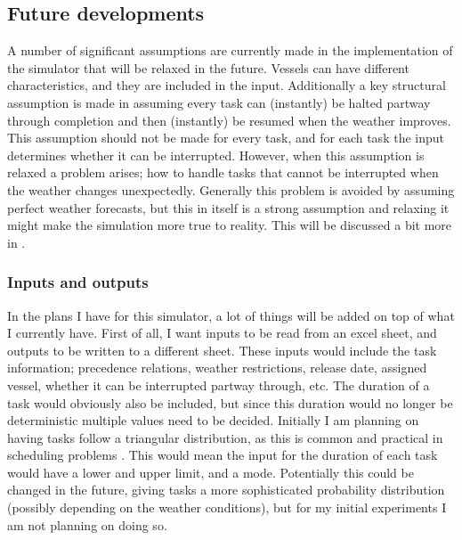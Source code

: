 \documentclass[a4paper,12pt]{article}
\begin{document}
\subsection{Future developments} \label{ss:simfut}
A number of significant assumptions are currently made in the implementation of the simulator that will be relaxed in the future. Vessels can have different characteristics, and they are included in the input. Additionally a key structural assumption is made in assuming every task can (instantly) be halted partway through completion and then (instantly) be resumed when the weather improves. This assumption should not be made for every task, and for each task the input determines whether it can be interrupted. However, when this assumption is relaxed a problem arises; how to handle tasks that cannot be interrupted when the weather changes unexpectedly. Generally this problem is avoided by assuming perfect weather forecasts, but this in itself is a strong assumption and relaxing it might make the simulation more true to reality. This will be discussed a bit more in . 

\subsubsection{Inputs and outputs} \label{sss:inou}
In the plans I have for this simulator, a lot of things will be added on top of what I currently have. First of all, I want inputs to be read from an excel sheet, and outputs to be written to a different sheet. These inputs would include the task information; precedence relations, weather restrictions, release date, assigned vessel, whether it can be interrupted partway through, etc.  The duration of a task would obviously also be included, but since this duration would no longer be deterministic multiple values need to be decided. Initially I am planning on having tasks follow a triangular distribution, as this is common and practical in scheduling problems \cite{williams1992practical}. This would mean the input for the duration of each task would have a lower and upper limit, and a mode. Potentially this could be changed in the future, giving tasks a more sophisticated probability distribution (possibly depending on the weather conditions), but for my initial experiments I am not planning on doing so.
\end{document}
